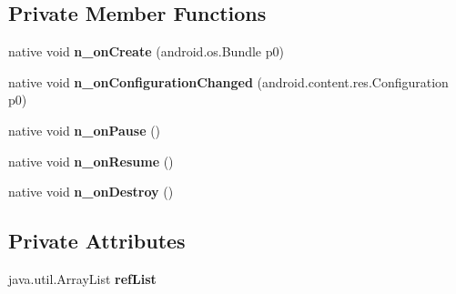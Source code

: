 \subsection*{Private Member Functions}
\begin{DoxyCompactItemize}
\item 
\mbox{\label{classmd59e336b20c5f59a4196ec0611a339f132_1_1AndroidGameActivity_ac1a3821d61010adfad04e817746a70c5}} 
native void {\bfseries n\+\_\+on\+Create} (android.\+os.\+Bundle p0)
\item 
\mbox{\label{classmd59e336b20c5f59a4196ec0611a339f132_1_1AndroidGameActivity_a802e0abe74fcb821a7053c89f0364466}} 
native void {\bfseries n\+\_\+on\+Configuration\+Changed} (android.\+content.\+res.\+Configuration p0)
\item 
\mbox{\label{classmd59e336b20c5f59a4196ec0611a339f132_1_1AndroidGameActivity_a18fa97f2d4be5fd6cb963a1015b694cc}} 
native void {\bfseries n\+\_\+on\+Pause} ()
\item 
\mbox{\label{classmd59e336b20c5f59a4196ec0611a339f132_1_1AndroidGameActivity_a5408fff6d06a22d0f8c7bb67bfc2599d}} 
native void {\bfseries n\+\_\+on\+Resume} ()
\item 
\mbox{\label{classmd59e336b20c5f59a4196ec0611a339f132_1_1AndroidGameActivity_a9b3a256ba93083f5943c68722744f767}} 
native void {\bfseries n\+\_\+on\+Destroy} ()
\end{DoxyCompactItemize}
\subsection*{Private Attributes}
\begin{DoxyCompactItemize}
\item 
\mbox{\label{classmd59e336b20c5f59a4196ec0611a339f132_1_1AndroidGameActivity_a0da5371249d36758a0e541a656dd5cf2}} 
java.\+util.\+Array\+List {\bfseries ref\+List}
\end{DoxyCompactItemize}


